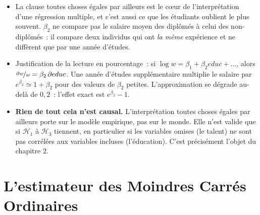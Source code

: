 \documentclass[10pt,a4paper]{article}
\theoremstyle{definition}
\renewcommand{\newline}{\unskip\par\vspace{1.5pt}}
\begin{document}
\begin{notes}

  \begin{itemize}

  \item La clause \guillemotleft toutes choses égales par ailleurs \guillemotright{} est
    le c\oe ur de l'interprétation d'une régression multiple, et c'est aussi ce que les
    étudiants oublient le plus souvent. $\beta_2$ ne compare pas le salaire moyen des
    diplômés à celui des non-diplômés~: il compare deux individus qui ont \emph{la même}
    expérience et ne diffèrent que par une année d'études.\newline

  \item Justification de la lecture en pourcentage~: si $\log w = \beta_1 + \beta_2 educ
    + \dots$, alors $\nicefrac{\partial w}{w} = \beta_2\, \partial educ$. Une année
    d'études supplémentaire multiplie le salaire par $e^{\beta_2}\simeq 1+\beta_2$ pour
    des valeurs de $\beta_2$ petites. L'approximation se dégrade au-delà de $0{,}2$~:
    l'effet exact est $e^{\beta_2}-1$.\newline

  \item \textbf{Rien de tout cela n'est causal.} L'interprétation \guillemotleft toutes
    choses égales par ailleurs \guillemotright{} porte sur le modèle empirique, pas sur
    le monde. Elle n'est valide que si $\mathcal H_1$ à $\mathcal H_3$ tiennent, en
    particulier si les variables omises (le talent) ne sont pas corrélées aux variables
    incluses (l'éducation). C'est précisément l'objet du chapitre 2.

  \end{itemize}

\end{notes}


\section{L'estimateur des Moindres Carrés Ordinaires}
\end{document}
